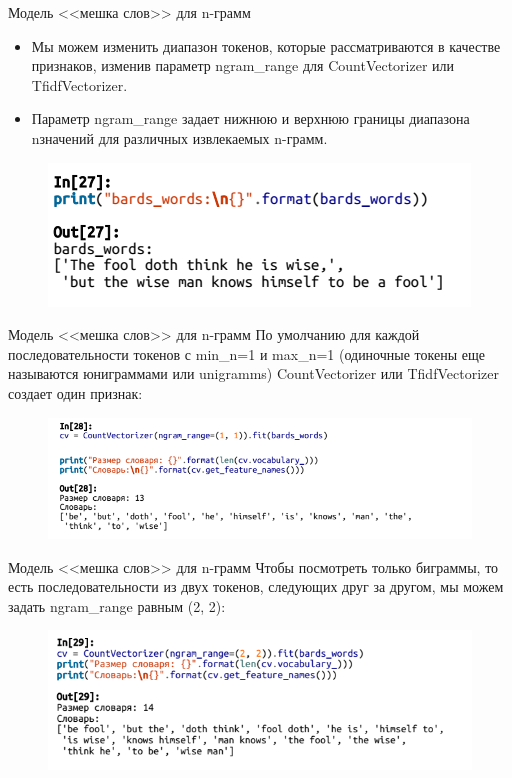 \documentclass{beamer}
\begin{document}
\begin{frame}{Модель <<мешка слов>> для n-грамм}
\begin{itemize}
\item Мы можем изменить диапазон токенов, которые рассматриваются в качестве признаков, изменив
параметр ngram\_range для CountVectorizer или TfidfVectorizer.
\item Параметр ngram\_range задает нижнюю и верхнюю границы диапазона nзначений для различных извлекаемых n-грамм. 
\end{itemize}
\begin{figure}[h]
\centering
\includegraphics[scale=0.75]{images/lec09-pic27.png}
\end{figure}
\end{frame}

\begin{frame}{Модель <<мешка слов>> для n-грамм}
По умолчанию для каждой последовательности токенов с min\_n=1 и max\_n=1 (одиночные токены еще называются юниграммами или unigramms) CountVectorizer или TfidfVectorizer создает один признак:
\begin{figure}[h]
\centering
\includegraphics[scale=0.75]{images/lec09-pic28.png}
\end{figure}
\end{frame}

\begin{frame}{Модель <<мешка слов>> для n-грамм}
Чтобы посмотреть только биграммы, то есть последовательности из двух токенов, следующих друг за другом, мы можем задать ngram\_range равным (2, 2):
\begin{figure}[h]
\centering
\includegraphics[scale=0.75]{images/lec09-pic29.png}
\end{figure}
\end{frame}
\end{document}
